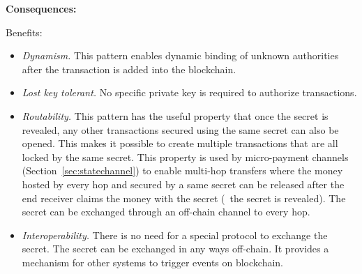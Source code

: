 \vspace{0.5em}\noindent \textbf{Consequences:} 

Benefits:
\begin{itemize}
  \item \textit{Dynamism.} This pattern enables dynamic binding of unknown authorities after the transaction is added into the blockchain.
  
  \item \textit{Lost key tolerant.} No specific private key is required to authorize transactions.
  
  \item \textit{Routability.} This pattern has the useful property that once the secret is revealed, any other transactions secured using the same secret can also be opened. This makes it possible to create multiple transactions that are all locked by the same secret. This property is used by micro-payment channels (Section~\ref{sec:statechannel}) to enable multi-hop transfers where the money hosted by every hop and secured by a same secret can be released after the end receiver claims the money with the secret (\ie\ the secret is revealed). The secret can be exchanged through an off-chain channel to every hop.   
  
  \item \textit{Interoperability.} There is no need for a special protocol to exchange the secret. The secret can be exchanged in any ways off-chain. It provides a mechanism for other systems to trigger events on blockchain. %
\end{itemize}

